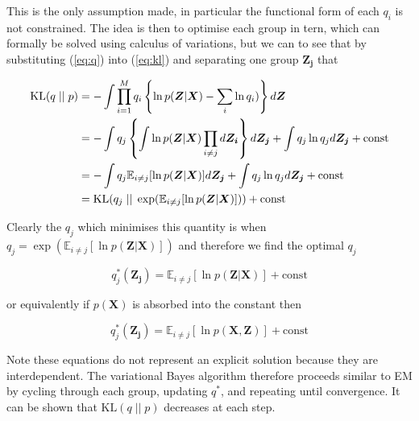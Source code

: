 \documentclass{article}
\begin{document}
This is the only assumption made, in particular the functional form of each $q_i$ is not constrained. The idea is then to optimise each group in tern, which can formally be solved using calculus of variations, but we can to see that by substituting (\ref{eq:q}) into (\ref{eq:kl}) and separating one group $\boldsymbol{Z_j}$ that

\begin{align}
    \text{KL}(q\; ||\; p) &= -\int \prod_{i = 1}^M q_i \left\{ \ln p(\boldsymbol{Z} | \boldsymbol{X}) - \sum_i \ln q_i) \right\} d \boldsymbol{Z}\notag \\
    &= -\int q_j \left\{ \int \ln p(\boldsymbol{Z} | \boldsymbol{X}) \prod_{i \ne j} d \boldsymbol{Z_i} \right\} d \boldsymbol{Z_j} + \int q_j \ln q_j d \boldsymbol{Z_j} + \text{const}\notag\\
    &= -\int q_j \mathbb{E}_{i \ne j}[\ln p(\boldsymbol{Z} | \boldsymbol{X})] d \boldsymbol{Z_j} + \int q_j \ln q_j d \boldsymbol{Z_j} + \text{const}\notag\\
    &= \text{KL}(q_j\; ||\; \exp (\mathbb{E}_{i \ne j}[\ln p(\boldsymbol{Z} | \boldsymbol{X})])) + \text{const}
\end{align}

Clearly the $q_j$ which minimises this quantity is when $q_j = \exp(\mathbb{E}_{i \ne j}[\ln p(\boldsymbol{Z} | \boldsymbol{X})])$ and therefore we find the optimal $q_j$

\begin{equation}
q^*_j(\boldsymbol{Z_j}) = \mathbb{E}_{i \ne j}[\ln p(\boldsymbol{Z} | \boldsymbol{X})] + \text{const}
\end{equation}

or equivalently if $p(\boldsymbol{X})$ is absorbed into the constant then

\begin{equation}
\label{eq:q_opt}
q^*_j(\boldsymbol{Z_j}) = \mathbb{E}_{i \ne j}[\ln p(\boldsymbol{X}, \boldsymbol{Z})] + \text{const}
\end{equation}

Note these equations do not represent an explicit solution because they are interdependent. The variational Bayes algorithm therefore proceeds similar to EM by cycling through each group, updating $q^*$, and repeating until convergence. It can be shown that $\text{KL}(q\; ||\; p)$ decreases at each step.
\end{document}
